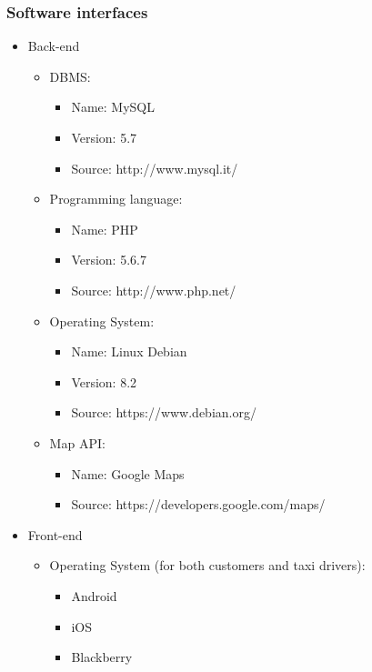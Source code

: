 \subsubsection{Software interfaces}
\begin{itemize}
\item Back-end
\begin{itemize}
	\item DBMS:
	\begin{itemize}
		\item Name: MySQL
		\item Version: 5.7
		\item Source: http://www.mysql.it/
	\end{itemize}
	
	\item Programming language:
	\begin{itemize}
		\item Name: PHP
		\item Version: 5.6.7
		\item Source: http://www.php.net/
	\end{itemize}
	
	\item Operating System:
	\begin{itemize}
		\item Name: Linux Debian
		\item Version: 8.2
		\item Source: https://www.debian.org/
	\end{itemize}	
	
	\item Map API:
	\begin{itemize}
		\item Name: Google Maps
		\item Source: https://developers.google.com/maps/
	\end{itemize}	
\end{itemize}

\item Front-end
\begin{itemize}
\item Operating System (for both customers and taxi drivers):
	\begin{itemize}
		\item Android
		\item iOS
		\item Blackberry
	\end{itemize}
\end{itemize}
\end{itemize}


